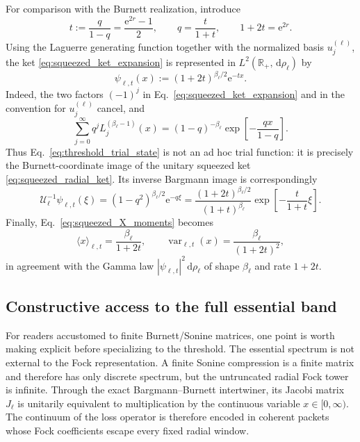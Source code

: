 \documentclass[11pt]{article}
\numberwithin{equation}{section}
\newcommand{\R}{\mathbb R}
\newcommand{\dd}{\,\mathrm d}
\newcommand{\e}{\mathrm e}
\theoremstyle{definition}
\begin{document}
For comparison with the Burnett realization, introduce
\begin{equation}
 t:=\frac{q}{1-q}=\frac{\e^{2r}-1}{2},
 \qquad
 q=\frac{t}{1+t},
 \qquad
 1+2t=\e^{2r}.
 \label{eq:t_r_q_relation}
\end{equation}
Using the Laguerre generating function \cite{NIST2010} together with the normalized basis
$u_j^{(\ell)}$, the ket \eqref{eq:squeezed_ket_expansion} is represented in
$L^2(\R_+,\dd\rho_\ell)$ by
\begin{equation}
 \psi_{\ell,t}(x)
 :=(1+2t)^{\beta_\ell/2}\e^{-tx}.
 \label{eq:threshold_trial_state}
\end{equation}
Indeed, the two factors $(-1)^j$ in
Eq.~\eqref{eq:squeezed_ket_expansion} and in the convention for
$u_j^{(\ell)}$ cancel, and
\begin{equation}
 \sum_{j=0}^{\infty}q^jL_j^{(\beta_\ell-1)}(x)
 =(1-q)^{-\beta_\ell}
 \exp\!\left[-\frac{qx}{1-q}\right].
\end{equation}
Thus Eq.~\eqref{eq:threshold_trial_state} is not an ad hoc trial function: it
is precisely the Burnett-coordinate image of the unitary squeezed ket
\eqref{eq:squeezed_radial_ket}.  Its inverse Bargmann image is correspondingly
\begin{equation}
 \mathcal U_\ell^{-1}\psi_{\ell,t}(\xi)
 =(1-q^2)^{\beta_\ell/2}\e^{-q\xi}
 =\frac{(1+2t)^{\beta_\ell/2}}{(1+t)^{\beta_\ell}}
 \exp\!\left[-\frac{t}{1+t}\xi\right].
 \label{eq:trial_Bargmann_state}
\end{equation}
Finally, Eq.~\eqref{eq:squeezed_X_moments} becomes
\begin{equation}
 \langle x\rangle_{\ell,t}
 =\frac{\beta_\ell}{1+2t},
 \qquad
 \operatorname{var}_{\ell,t}(x)
 =\frac{\beta_\ell}{(1+2t)^2},
 \label{eq:trial_x_moments}
\end{equation}
in agreement with the Gamma law
$|\psi_{\ell,t}|^2\dd\rho_\ell$ of shape $\beta_\ell$ and rate $1+2t$.

\subsection{Constructive access to the full essential band}
\label{sec:fock_essential_continuum}

For readers accustomed to finite Burnett/Sonine matrices, one point is worth
making explicit before specializing to the threshold.  The essential spectrum
is not external to the Fock representation.  A finite Sonine compression is a
finite matrix and therefore has only discrete spectrum, but the untruncated
radial Fock tower is infinite.  Through the exact Bargmann--Burnett
intertwiner, its Jacobi matrix $J_\ell$ is unitarily equivalent to
multiplication by the continuous variable $x\in[0,\infty)$.  The continuum
of the loss operator is therefore encoded in coherent packets whose Fock
coefficients escape every fixed radial window.
\end{document}
